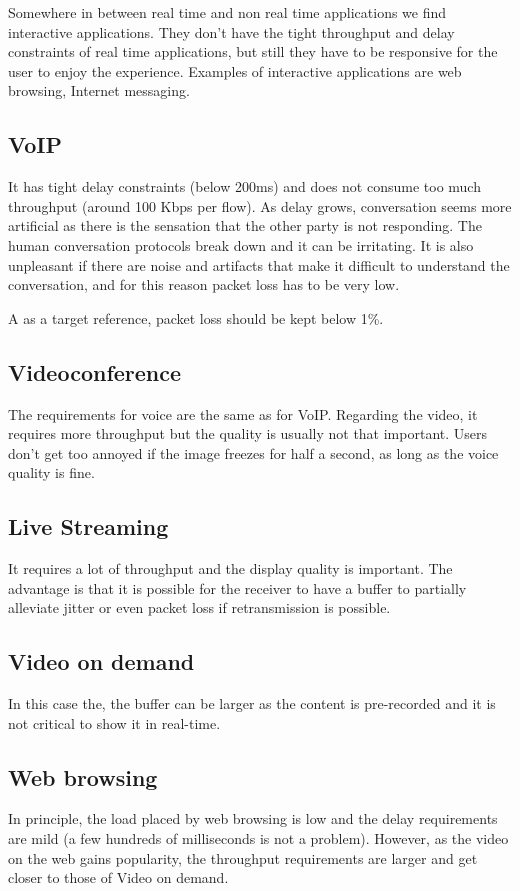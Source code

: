 Somewhere in between real time and non real time applications we find interactive applications. 
They don't have the tight throughput and delay constraints of real time applications, but still they have to be responsive for the user to enjoy the experience.
Examples of interactive applications are web browsing, Internet messaging.

\subsection{VoIP}
It has tight delay constraints (below 200ms) and does not consume too much throughput (around 100 Kbps per flow).
As delay grows, conversation seems more artificial as there is the sensation that the other party is not responding.
The human conversation protocols break down and it can be irritating.
It is also unpleasant if there are noise and artifacts that make it difficult to understand the conversation, and for this reason packet loss has to be very low.

A as a target reference, packet loss should be kept below 1\%.

\subsection{Videoconference}
The requirements for voice are the same as for VoIP.
Regarding the video, it requires more throughput but the quality is usually not that important.
Users don't get too annoyed if the image freezes for half a second, as long as the voice quality is fine.

\subsection{Live Streaming}
It requires a lot of throughput and the display quality is important.
The advantage is that it is possible for the receiver to have a buffer to partially alleviate jitter or even packet loss if retransmission is possible.

\subsection{Video on demand}
In this case the, the buffer can be larger as the content is pre-recorded and it is not critical to show it in real-time.

\subsection{Web browsing}
In principle, the load placed by web browsing is low and the delay requirements are mild (a few hundreds of milliseconds is not a problem). 
However, as the video on the web gains popularity, the throughput requirements are larger and get closer to those of Video on demand.

